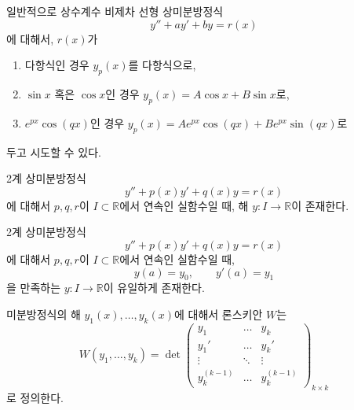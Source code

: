 \documentclass[../engineering_mathematics_lecture_note.tex]{subfiles}
\begin{document}
\begin{example}
    일반적으로 상수계수 비제차 선형 상미분방정식
    \begin{equation*}
        y'' + ay' + by = r(x)
    \end{equation*}
    에 대해서, $r(x)$가
    \begin{enumerate}
        \item 다항식인 경우 $y_p(x)$를 다항식으로,
        \item $\sin x$ 혹은 $\cos x$인 경우 $y_p(x) = A \cos x + B \sin x$로,
        \item $e^{px} \cos (qx)$인 경우 $y_p(x) = A e^{px} \cos (qx) + B e^{px} \sin (qx)$로
    \end{enumerate}
    두고 시도할 수 있다.
\end{example}

\begin{theorem}
    2계 상미분방정식
    \begin{equation*}
        y'' + p(x) y' + q(x) y = r(x)
    \end{equation*}
    에 대해서
    $p, q, r$이 $I \subset \mathbb R$에서 연속인 실함수일 때, 해 $y: I \rightarrow \mathbb R$이 존재한다.
\end{theorem}

\begin{theorem}  \label{thm:ivp}
    2계 상미분방정식
    \begin{equation*}
        y'' + p(x) y' + q(x) y = r(x)
    \end{equation*}
    에 대해서
    $p, q, r$이 $I \subset \mathbb R$에서 연속인 실함수일 때,
    \begin{equation*}
        y(a) = y_0, \qquad y'(a) = y_1
    \end{equation*}
    을 만족하는 $y: I \rightarrow \mathbb R$이 유일하게 존재한다.
\end{theorem}

\begin{definition} 
    미분방정식의 해 $y_1(x), \dots, y_k(x)$에 대해서 론스키안 $W$는
    \begin{equation*}
        W(y_1, \dots, y_k) = \det \begin{pmatrix}
            y_1 & \dots & y_k\\
            y_1' & \dots & y_k'\\
            \vdots & \ddots & \vdots\\
            y_k^{(k - 1)} & \dots & y_k^{(k - 1)}
        \end{pmatrix}_{k \times k}
    \end{equation*}
    로 정의한다.
\end{definition}
\end{document}
